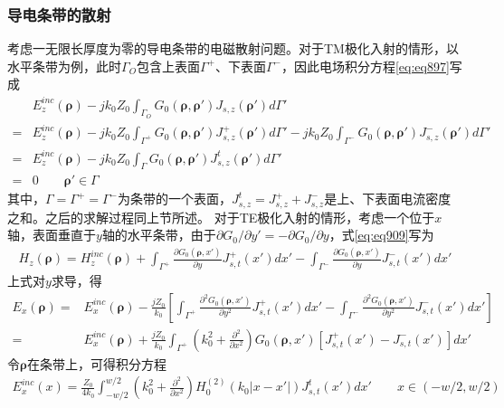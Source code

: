\documentclass{article}
\numberwithin{equation}{section}
\renewcommand{\vec}[1]{\boldsymbol{#1}}
\begin{document}
\subsubsection{导电条带的散射}
考虑一无限长厚度为零的导电条带的电磁散射问题。对于TM极化入射的情形，以水平条带为例，此时$\Gamma_O$包含上表面$\Gamma^+$、下表面$\Gamma^-$，因此电场积分方程\ref{eq:eq897}写成
\begin{align}
    \label{eq:eq910}
     &E_z^{inc}(\vec{\rho})-jk_0Z_0\int_{\Gamma_O}G_0(\vec{\rho},\vec{\rho}')J_{s,z}(\vec{\rho}')d\Gamma' \nonumber \\
    =&E_z^{inc}(\vec{\rho})-jk_0Z_0\int_{\Gamma^+}G_0(\vec{\rho},\vec{\rho}')J^+_{s,z}(\vec{\rho}')d\Gamma'-jk_0Z_0\int_{\Gamma^-}G_0(\vec{\rho},\vec{\rho}')J^-_{s,z}(\vec{\rho}')d\Gamma' \nonumber \\
    =&E_z^{inc}(\vec{\rho})-jk_0Z_0\int_{\Gamma}G_0(\vec{\rho},\vec{\rho}')J^t_{s,z}(\vec{\rho}')d\Gamma' \nonumber \\
    =&0\qquad\vec{\rho}'\in\Gamma
\end{align}
其中，$\Gamma=\Gamma^+=\Gamma^-$为条带的一个表面，$J^t_{s,z}=J^+_{s,z}+J^-_{s,z}$是上、下表面电流密度之和。之后的求解过程同上节所述。
对于TE极化入射的情形，考虑一个位于$x$轴，表面垂直于$y$轴的水平条带，由于$\partial G_0/\partial y'=-\partial G_0/\partial y$，式\ref{eq:eq909}写为
\begin{align}
    \label{eq:eq911}
    H_z(\vec{\rho})=H_z^{inc}(\vec{\rho})+\int_{\Gamma^+}\frac{\partial G_0(\vec{\rho},x')}{\partial y}J^+_{s,t}(x')dx'-\int_{\Gamma^-}\frac{\partial G_0(\vec{\rho},x')}{\partial y}J^-_{s,t}(x')dx'
\end{align}
上式对$y$求导，得
\begin{align}
    \label{eq:eq912}
    E_x(\vec{\rho})=&E_x^{inc}(\vec{\rho})-\frac{jZ_0}{k_0}\left[\int_{\Gamma^+}\frac{\partial^2 G_0(\vec{\rho},x')}{\partial y^2}J^+_{s,t}(x')dx'-\int_{\Gamma^-}\frac{\partial^2 G_0(\vec{\rho},x')}{\partial y^2}J^-_{s,t}(x')dx'\right] \nonumber \\
                   =&E_x^{inc}(\vec{\rho})+\frac{jZ_0}{k_0}\int_{\Gamma^+}\left(k_0^2+\frac{\partial^2}{\partial x^2}\right)G_0(\vec{\rho},x')\left[J^+_{s,t}(x')-J^-_{s,t}(x')\right]dx'
\end{align}
令$\vec{\rho}$在条带上，可得积分方程
\begin{align}
    \label{eq:eq913}
    E_x^{inc}(x)=\frac{Z_0}{4k_0}\int_{-w/2}^{w/2}\left(k_0^2+\frac{\partial^2}{\partial x^2}\right)H_0^{(2)}(k_0|x-x'|)J^t_{s,t}(x')dx'\qquad x\in(-w/2,w/2)
\end{align}
\end{document}
